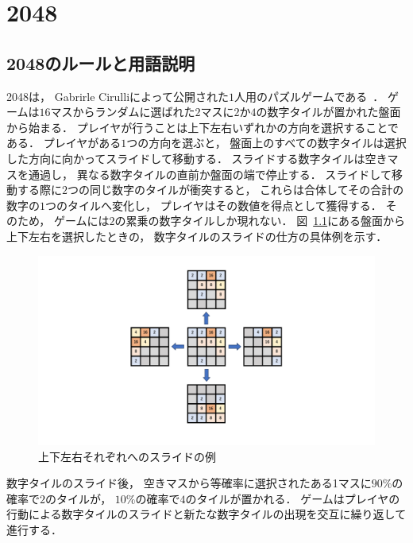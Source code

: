 \chapter{2048}

\section{2048のルールと用語説明}
\label{sec:rule}
2048は， Gabrirle Cirulliによって公開された$1$人用のパズルゲームである~\cite{2048}．
ゲームは$16$マスからランダムに選ばれた$2$マスに$2$か$4$の数字タイルが置かれた盤面から始まる．
プレイヤが行うことは上下左右いずれかの方向を選択することである． 
プレイヤがある$1$つの方向を選ぶと， 盤面上のすべての数字タイルは選択した方向に向かってスライドして移動する．
スライドする数字タイルは空きマスを通過し， 異なる数字タイルの直前か盤面の端で停止する．
スライドして移動する際に$2$つの同じ数字のタイルが衝突すると， これらは合体してその合計の数字の$1$つのタイルへ変化し， プレイヤはその数値を得点として獲得する．
そのため， ゲームには$2$の累乗の数字タイルしか現れない．
図~\ref{fig:all_directions}にある盤面から上下左右を選択したときの， 数字タイルのスライドの仕方の具体例を示す．
\begin{figure}[t]
    \centering
    \includegraphics[width=\linewidth{}]{figures/all_directions.pdf}
    \caption{上下左右それぞれへのスライドの例 \label{fig:all_directions}}
\end{figure}

数字タイルのスライド後， 空きマスから等確率に選択されたある1マスに$90\%$の確率で$2$のタイルが， $10\%$の確率で$4$のタイルが置かれる． 
ゲームはプレイヤの行動による数字タイルのスライドと新たな数字タイルの出現を交互に繰り返して進行する．

